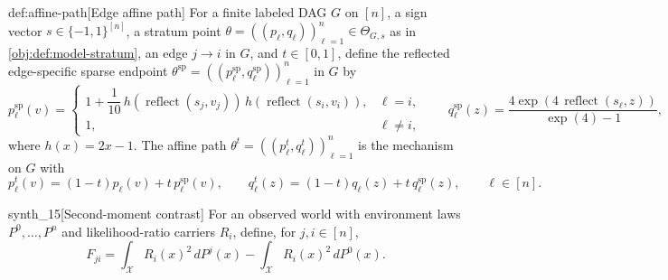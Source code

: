 \documentclass[11pt]{article}
\begin{document}
\begin{definitionv}{def:affine-path}[Edge affine path]
For a finite labeled DAG \(G\) on \([n]\), a sign vector \(s\in\{-1,1\}^{[n]}\), a stratum point \(\theta=((p_\ell,q_\ell))_{\ell=1}^n\in\Theta_{G,s}\) as in \cref{obj:def:model-stratum}, an edge \(j\to i\) in \(G\), and \(t\in[0,1]\), define the reflected edge-specific sparse endpoint \(\theta^{\mathrm{sp}}=((p_\ell^{\mathrm{sp}},q_\ell^{\mathrm{sp}}))_{\ell=1}^n\) in \(G\) by
\[
p_\ell^{\mathrm{sp}}(v)=
\begin{cases}
1+\dfrac{1}{10}\,h(\operatorname{reflect}(s_j,v_j))\,h(\operatorname{reflect}(s_i,v_i)), & \ell=i,\\
1, & \ell\ne i,
\end{cases}
\qquad
q_\ell^{\mathrm{sp}}(z)=
\dfrac{4\exp(4\,\operatorname{reflect}(s_\ell,z))}{\exp(4)-1},
\]
where \(h(x)=2x-1\). The affine path \(\theta^t=((p_\ell^t,q_\ell^t))_{\ell=1}^n\) is the mechanism on \(G\) with
\[
p_\ell^t(v)=(1-t)p_\ell(v)+t\,p_\ell^{\mathrm{sp}}(v),
\qquad
q_\ell^t(z)=(1-t)q_\ell(z)+t\,q_\ell^{\mathrm{sp}}(z),
\qquad \ell\in[n].
\]
\end{definitionv}

\begin{definitionv}{synth_15}[Second-moment contrast]
For an observed world with environment laws \(P^0,\ldots,P^n\) and likelihood-ratio carriers \(R_i\), define, for \(j,i\in[n]\),
\[
F_{ji}
=
\int_{\mathcal X} R_i(x)^2\,dP^j(x)
-
\int_{\mathcal X} R_i(x)^2\,dP^0(x).
\]
\end{definitionv}
\end{document}
